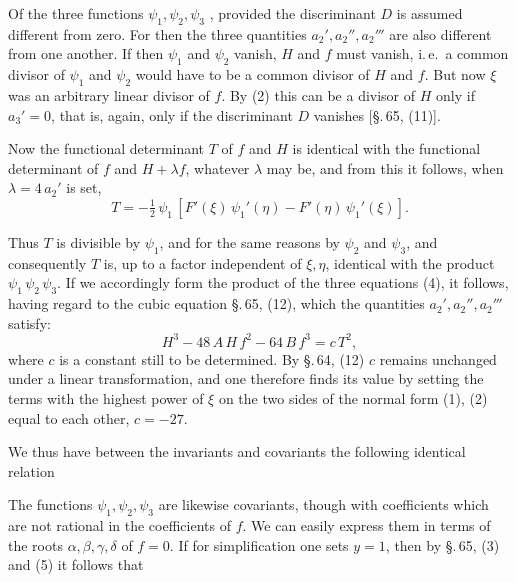 
Of the three functions $\psi_1, \psi_2, \psi_3$ , provided the discriminant
$D$ is assumed different from zero. For
then the three quantities $a_2', a_2'', a_2'''$ are also different from one another.
If then $\psi_1$ and $\psi_2$ vanish, $H$ and
$f$ must vanish, i.\,e.\ a common divisor of $\psi_1$ and $\psi_2$
would have to be a common divisor of $H$ and $f$. But now $\xi$
was an arbitrary linear divisor of $f$. By (2) this can be
a divisor of $H$ only if $a_3' = 0$, that is, again, only if
the discriminant $D$ vanishes [§.\,65, (11)].

Now the functional determinant $T$ of $f$ and $H$ is identical
with the functional determinant of $f$ and $H + \lambda f$, whatever
$\lambda$ may be, and from this it follows, when $\lambda = 4\,a_2'$ is
set,
\[
T = -\tfrac{1}{2}\,\psi_1\,[F'(\xi)\,\psi_1'(\eta) - F'(\eta)\,\psi_1'(\xi)].
\]

Thus $T$ is divisible by $\psi_1$, and for the same reasons
by $\psi_2$ and $\psi_3$, and consequently $T$ is, up to a factor independent
of $\xi, \eta$, identical with the product $\psi_1\,\psi_2\,\psi_3$.
If we accordingly form the product of the three equations (4),
it follows, having regard to the cubic equation §.\,65, (12),
which the quantities $a_2', a_2'', a_2'''$ satisfy:
\[
H^3 - 48\,A\,H\,f^2 - 64\,B\,f^3 = c\,T^2,
\]
where $c$ is a constant still to be determined. By §.\,64, (12)
$c$ remains unchanged under a linear transformation, and one
therefore finds its value by setting the terms with the highest
power of $\xi$ on the two sides of the normal form (1), (2)
equal to each other, $c = -27$.

We thus have between the invariants and covariants
the following identical relation

The functions $\psi_1, \psi_2, \psi_3$ are likewise covariants, though
with coefficients which are not rational in the coefficients
of $f$. We can easily express them in terms of the roots $\alpha, \beta, \gamma, \delta$
of $f = 0$. If for simplification one sets $y = 1$,
then by §.\,65, (3) and (5) it follows that
